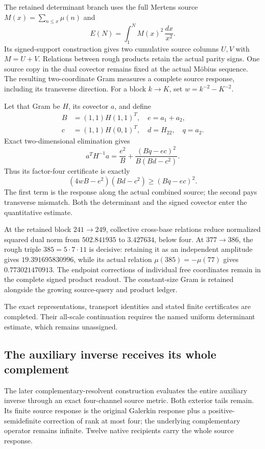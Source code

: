 The retained determinant branch uses the full Mertens source
\(M(x)=\sum_{n\leq x}\mu(n)\) and
\[
 E(N)=\int_1^NM(x)^2\,\frac{dx}{x^2}.
\]
Its signed-support construction gives two cumulative source columns
\(U,V\) with \(M=U+V\). Relations between rough products retain the
actual parity signs. One source copy in the dual covector remains fixed
at the actual Möbius sequence. The resulting two-coordinate Gram
measures a complete source response, including its transverse
direction. For a block \(k\to K\), set \(w=k^{-2}-K^{-2}\).

Let that Gram be \(H\), its covector \(a\), and define
\[
\begin{aligned}
 B&=(1,1)H(1,1)^T,\quad e=a_1+a_2,\\
 c&=(1,1)H(0,1)^T,\quad d=H_{22},\quad q=a_2.
\end{aligned}
\]
Exact two-dimensional elimination gives
\[
 a^TH^{-1}a=\frac{e^2}{B}
       +\frac{(Bq-ec)^2}{B(Bd-c^2)}.
\]
Thus its factor-four certificate is exactly
\[
 (4wB-e^2)(Bd-c^2)\geq(Bq-ec)^2.
\]
The first term is the response along the actual combined source;
the second pays transverse mismatch. Both the determinant and the
signed covector enter the quantitative estimate.

At the retained block \(241\to249\), collective cross-base relations
reduce normalized squared dual norm from \(502.841935\) to
\(3.427634\), below four. At \(377\to386\), the rough triple
\(385=5\cdot7\cdot11\) is decisive: retaining it as an independent
amplitude gives \(19.391695830996\), while its actual relation
\(\mu(385)=-\mu(77)\) gives \(0.773021470913\). The endpoint
corrections of individual free coordinates remain in the complete
signed product readout. The constant-size Gram is retained alongside
the growing source-query and product ledger.

The exact representations, transport identities and stated finite certificates are completed. Their all-scale continuation requires the named uniform determinant estimate, which remains unassigned.

\subsection{The auxiliary inverse receives its whole complement}

The later complementary-resolvent construction evaluates the entire
auxiliary inverse through an exact four-channel source metric. Both
exterior tails remain. Its finite source response is the original
Galerkin response plus a positive-semidefinite correction of rank at
most four; the underlying complementary operator remains infinite.
Twelve native recipients carry the whole source response.

